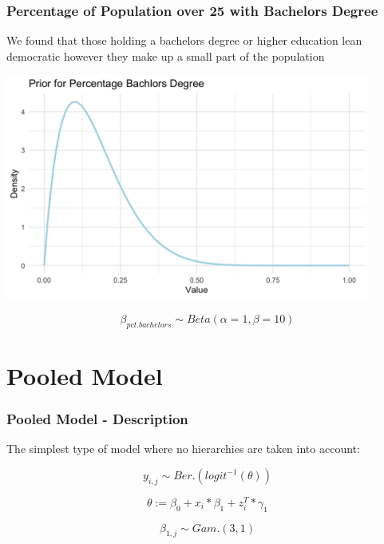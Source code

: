 \documentclass{beamer}
\begin{document}
\begin{frame}
  \frametitle{Percentage of Population over 25 with Bachelors Degree}
  We found that those holding a bachelors degree or higher education lean democratic however they make up a small part of the population 
  \begin{center}
    \includegraphics[width=0.9\textwidth]{plots/prior_pct.bachelors.png}
  \end{center}
  

  $$  \beta_{pct.bachelors} \sim Beta( \alpha = 1 , \beta = 10 )$$
\end{frame}



\section{Pooled Model}

\begin{frame}
\frametitle{Pooled Model - Description}

The simplest type of model where no hierarchies are taken into account:

\[y_{i, j} \sim Ber.(logit^{-1}(\theta))\]

\[\theta := \beta_0 + x_{i} * \beta_{1}  + z_{i}^T * \gamma_{1}\]

\[\beta_{1,j} \sim Gam.(3, 1)\]

\end{frame}
\end{document}
